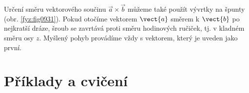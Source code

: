     \begin{mdframed}[style=mdnote]       
      Určení směru vektorového součinu \(\vec{a}\times\vec{b}\) můžeme také použít vývrtky na špunty
      (obr. \ref{fyz:fig0931}). Pokud otočíme vektorem \(\vect{a}\) směrem k \(\vect{b}\) po
      nejkratší dráze, šroub se zavrtává proti směru hodinových ručiček, tj. v kladném směru osy
      \(z\). Myšlený pohyb provádíme vždy s vektorem, který je uveden jako první.

      {\centering
        \captionsetup{type=figure} 
        \label{fyz:fig0931}
      \par}
    \end{mdframed}

  \section{Příklady a cvičení}\label{fyz:IchapXIsecVIII}
      
      
